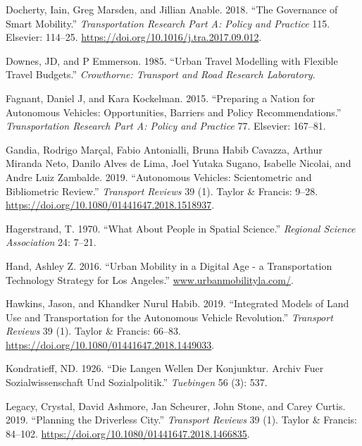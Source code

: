 \documentclass[12pt,]{article}
\begin{document}
\leavevmode\hypertarget{ref-docherty2018governance}{}%
Docherty, Iain, Greg Marsden, and Jillian Anable. 2018. ``The Governance
of Smart Mobility.'' \emph{Transportation Research Part A: Policy and
Practice} 115. Elsevier: 114--25.
\url{https://doi.org/10.1016/j.tra.2017.09.012}.

\leavevmode\hypertarget{ref-downes1985urban}{}%
Downes, JD, and P Emmerson. 1985. ``Urban Travel Modelling with Flexible
Travel Budgets.'' \emph{Crowthorne: Transport and Road Research
Laboratory}.

\leavevmode\hypertarget{ref-fagnant2015preparing}{}%
Fagnant, Daniel J, and Kara Kockelman. 2015. ``Preparing a Nation for
Autonomous Vehicles: Opportunities, Barriers and Policy
Recommendations.'' \emph{Transportation Research Part A: Policy and
Practice} 77. Elsevier: 167--81.

\leavevmode\hypertarget{ref-gandia2019autonomous}{}%
Gandia, Rodrigo Marçal, Fabio Antonialli, Bruna Habib Cavazza, Arthur
Miranda Neto, Danilo Alves de Lima, Joel Yutaka Sugano, Isabelle
Nicolai, and Andre Luiz Zambalde. 2019. ``Autonomous Vehicles:
Scientometric and Bibliometric Review.'' \emph{Transport Reviews} 39
(1). Taylor \& Francis: 9--28.
\url{https://doi.org/10.1080/01441647.2018.1518937}.

\leavevmode\hypertarget{ref-hagerstrand1970people}{}%
Hagerstrand, T. 1970. ``What About People in Spatial Science.''
\emph{Regional Science Association} 24: 7--21.

\leavevmode\hypertarget{ref-hand2016mobility_LA}{}%
Hand, Ashley Z. 2016. ``Urban Mobility in a Digital Age - a
Transportation Technology Strategy for Los Angeles.''
\url{www.urbanmobilityla.com/}.

\leavevmode\hypertarget{ref-hawkins2019integrated}{}%
Hawkins, Jason, and Khandker Nurul Habib. 2019. ``Integrated Models of
Land Use and Transportation for the Autonomous Vehicle Revolution.''
\emph{Transport Reviews} 39 (1). Taylor \& Francis: 66--83.
\url{https://doi.org/10.1080/01441647.2018.1449033}.

\leavevmode\hypertarget{ref-kondratieff1926langen}{}%
Kondratieff, ND. 1926. ``Die Langen Wellen Der Konjunktur. Archiv Fuer
Sozialwissenschaft Und Sozialpolitik.'' \emph{Tuebingen} 56 (3): 537.

\leavevmode\hypertarget{ref-legacy2019planning}{}%
Legacy, Crystal, David Ashmore, Jan Scheurer, John Stone, and Carey
Curtis. 2019. ``Planning the Driverless City.'' \emph{Transport Reviews}
39 (1). Taylor \& Francis: 84--102.
\url{https://doi.org/10.1080/01441647.2018.1466835}.
\end{document}
